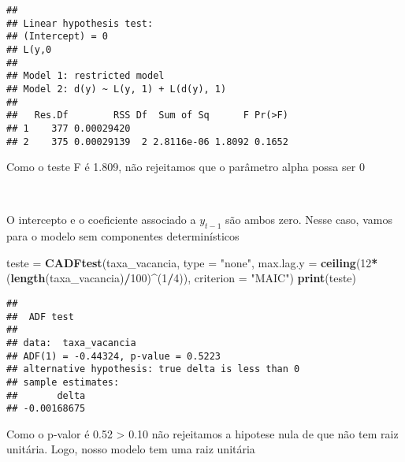 \documentclass[
]{article}
\newenvironment{Shaded}{\begin{snugshade}}{\end{snugshade}}
\newcommand{\AttributeTok}[1]{\textcolor[rgb]{0.13,0.29,0.53}{#1}}
\newcommand{\DecValTok}[1]{\textcolor[rgb]{0.00,0.00,0.81}{#1}}
\newcommand{\FunctionTok}[1]{\textcolor[rgb]{0.13,0.29,0.53}{\textbf{#1}}}
\newcommand{\NormalTok}[1]{#1}
\newcommand{\OtherTok}[1]{\textcolor[rgb]{0.56,0.35,0.01}{#1}}
\newcommand{\SpecialCharTok}[1]{\textcolor[rgb]{0.81,0.36,0.00}{\textbf{#1}}}
\newcommand{\StringTok}[1]{\textcolor[rgb]{0.31,0.60,0.02}{#1}}
\begin{document}
\begin{Shaded}
\end{Shaded}

\begin{verbatim}
## 
## Linear hypothesis test:
## (Intercept) = 0
## L(y,0
## 
## Model 1: restricted model
## Model 2: d(y) ~ L(y, 1) + L(d(y), 1)
## 
##   Res.Df        RSS Df  Sum of Sq      F Pr(>F)
## 1    377 0.00029420                            
## 2    375 0.00029139  2 2.8116e-06 1.8092 0.1652
\end{verbatim}

Como o teste F é 1.809, não rejeitamos que o parâmetro alpha possa ser 0

~

O intercepto e o coeficiente associado a \(y_{t-1}\) são ambos zero.
Nesse caso, vamos para o modelo sem componentes determinísticos

\begin{Shaded}
\begin{Highlighting}[]
\NormalTok{teste }\OtherTok{=} \FunctionTok{CADFtest}\NormalTok{(taxa\_vacancia, }\AttributeTok{type =} \StringTok{"none"}\NormalTok{, }\AttributeTok{max.lag.y =} \FunctionTok{ceiling}\NormalTok{(}\DecValTok{12}\SpecialCharTok{*}\NormalTok{(}\FunctionTok{length}\NormalTok{(taxa\_vacancia)}\SpecialCharTok{/}\DecValTok{100}\NormalTok{)}\SpecialCharTok{\^{}}\NormalTok{(}\DecValTok{1}\SpecialCharTok{/}\DecValTok{4}\NormalTok{)), }
                 \AttributeTok{criterion =} \StringTok{"MAIC"}\NormalTok{)}
\FunctionTok{print}\NormalTok{(teste)}
\end{Highlighting}
\end{Shaded}

\begin{verbatim}
## 
##  ADF test
## 
## data:  taxa_vacancia
## ADF(1) = -0.44324, p-value = 0.5223
## alternative hypothesis: true delta is less than 0
## sample estimates:
##       delta 
## -0.00168675
\end{verbatim}

Como o p-valor é 0.52 \textgreater{} 0.10 não rejeitamos a hipotese nula
de que não tem raiz unitária. Logo, nosso modelo tem uma raiz unitária
\end{document}
